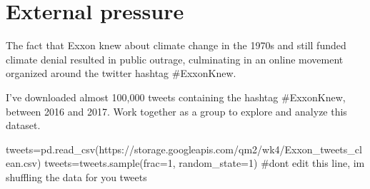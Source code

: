 \documentclass[
  letterpaper,
  DIV=11,
  numbers=noendperiod]{scrreprt}
\newenvironment{Shaded}{\begin{snugshade}}{\end{snugshade}}
\newcommand{\CommentTok}[1]{\textcolor[rgb]{0.37,0.37,0.37}{#1}}
\newcommand{\DecValTok}[1]{\textcolor[rgb]{0.68,0.00,0.00}{#1}}
\newcommand{\NormalTok}[1]{\textcolor[rgb]{0.00,0.23,0.31}{#1}}
\newcommand{\OperatorTok}[1]{\textcolor[rgb]{0.37,0.37,0.37}{#1}}
\newcommand{\StringTok}[1]{\textcolor[rgb]{0.13,0.47,0.30}{#1}}
\begin{document}

\hypertarget{external-pressure}{%
\chapter{External pressure}\label{external-pressure}}

The fact that Exxon knew about climate change in the 1970s and still
funded climate denial resulted in public outrage, culminating in an
online movement organized around the twitter hashtag \#ExxonKnew.

I've downloaded almost 100,000 tweets containing the hashtag
\#ExxonKnew, between 2016 and 2017. Work together as a group to explore
and analyze this dataset.

\begin{Shaded}
\begin{Highlighting}[]
\NormalTok{tweets}\OperatorTok{=}\NormalTok{pd.read\_csv(}\StringTok{\textquotesingle{}https://storage.googleapis.com/qm2/wk4/Exxon\_tweets\_clean.csv\textquotesingle{}}\NormalTok{)}
\NormalTok{tweets}\OperatorTok{=}\NormalTok{tweets.sample(frac}\OperatorTok{=}\DecValTok{1}\NormalTok{, random\_state}\OperatorTok{=}\DecValTok{1}\NormalTok{) }\CommentTok{\#don\textquotesingle{}t edit this line, i\textquotesingle{}m shuffling the data for you}
\NormalTok{tweets}
\end{Highlighting}
\end{Shaded}
\end{document}
